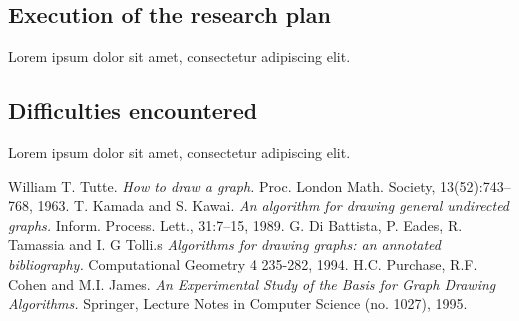 \documentclass[a4paper,12pt,twoside]{article}
\begin{document}
\subsection{Execution of the research plan}
Lorem ipsum dolor sit amet, consectetur adipiscing elit.\subsection{Difficulties encountered}
Lorem ipsum dolor sit amet, consectetur adipiscing elit.

\begin{thebibliography}{99}
William T. Tutte. \emph{How to draw a graph.} Proc. London Math. Society, 13(52):743–768, 1963.
T. Kamada and S. Kawai. \emph{An algorithm for drawing general undirected graphs.} Inform. Process. Lett., 31:7–15, 1989.
G. Di Battista, P. Eades, R. Tamassia and I. G Tolli.s \emph{Algorithms for drawing graphs: an annotated bibliography.} Computational Geometry 4 235-282, 1994.
H.C. Purchase, R.F. Cohen and M.I. James. \emph{An Experimental Study of the Basis for Graph Drawing Algorithms.} Springer, Lecture Notes in Computer Science (no. 1027), 1995.
\end{thebibliography}
\end{document}
